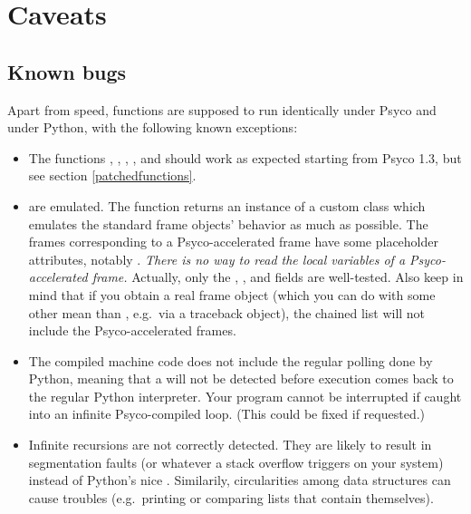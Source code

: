 \documentclass{manual}
\begin{document}
\appendix
\chapter{Caveats}


\section{Known bugs}\label{bugs}

Apart from speed, functions are supposed to run identically under Psyco and under Python, with the following known exceptions:
%
%
\begin{itemize}

\item The functions , , , ,  and  should work as expected starting from Psyco 1.3, but see section \ref{patchedfunctions}.
  
\item {} are emulated.  The  function returns an instance of a custom class which emulates the standard frame objects' behavior as much as possible.  The frames corresponding to a Psyco-accelerated frame have some placeholder attributes, notably .  \emph{There is no way to read the local variables of a Psyco-accelerated frame.}  Actually, only the , ,  and  fields are well-tested.  Also keep in mind that if you obtain a real frame object (which you can do with some other mean than , e.g.\ via a traceback object), the  chained list will not include the Psyco-accelerated frames.

\item The compiled machine code does not include the regular polling done by Python, meaning that a  will not be detected before execution comes back to the regular Python interpreter.  Your program cannot be interrupted if caught into an infinite Psyco-compiled loop.  (This could be fixed if requested.)

\item Infinite recursions are not correctly detected. They are likely to result in segmentation faults (or whatever a stack overflow triggers on your system) instead of Python's nice . Similarily, circularities among data structures can cause troubles (e.g.\ printing or comparing lists that contain themselves).

\end{itemize}
\end{document}

